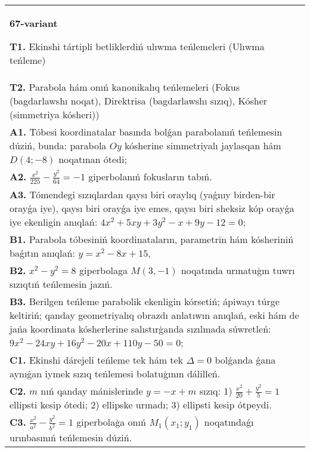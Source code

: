 \documentclass{article}
\begin{document}
\begin{tabular}{m{17cm}}
\textbf{67-variant}
\newline

\textbf{T1.} Ekinshi tártipli betliklerdiń ulıwma teńlemeleri (Ulıwma teńleme) \\
\textbf{T2.} Parabola hám onıń kanonikalıq teńlemeleri (Fokus (bagdarlawshı noqat), Direktrisa (bagdarlawshı sızıq), Kósher (simmetriya kósheri)) \\
\textbf{A1.} Tóbesi koordinatalar basında bolǵan parabolanıń teńlemesin dúziń, bunda: parabola $Oy$ kósherine simmetriyalı jaylasqan hám $D (4; -8) $ noqatınan ótedi; \\
\textbf{A2.} $\frac{x^2}{225}-\frac{y^2}{64}=-1$ giperbolanıń fokusların tabıń. \\
\textbf{A3.} Tómendegi sızıqlardan qaysı biri oraylıq (yaǵnıy birden-bir orayǵa iye), qaysı biri orayǵa iye emes, qaysı biri sheksiz kóp orayǵa iye ekenligin anıqlań: $4 x^2+5 x y+3 y^2-x+9 y-12=0$; \\
\textbf{B1.} Parabola tóbesiniń koordinataların, parametrin hám kósheriniń baǵıtın anıqlań: $y=x^2-8 x+15$, \\
\textbf{B2.} $x^2-y^2=8$ giperbolaga $M(3,-1)$ noqatında urınatuģın tuwrı sızıqtıń teńlemesin jazıń. \\
\textbf{B3.} Berilgen teńleme parabolik ekenligin kórsetiń; ápiwayı túrge keltiriń; qanday geometriyalıq obrazdı anlatıwın anıqlań, eski hám de jańa koordinata kósherlerine salıstırģanda sızılmada súwretleń:$9 x^2-24 x y+16 y^2-20 x+110 y-50=0$; \\
\textbf{C1.} Ekinshi dárejeli teńleme tek hám tek $\Delta=0$ bolǵanda ǵana aynıǵan iymek sızıq teńlemesi bolatuģının dálilleń. \\
\textbf{C2.} $m$ nıń qanday mánislerinde $y=-x+m$ sızıq: 1) $\frac{x^2}{20}+\frac{y^2}{5}=1$ ellipsti kesip ótedi; 2) ellipske urınadı; 3) ellipsti kesip ótpeydi. \\
\textbf{C3.} $\frac{x^2}{a^2}-\frac{y^2}{b^2}=1$ giperbolaģa onıń $M_1\left(x_1; y_1\right) $ noqatındaǵı urınbasınıń teńlemesin dúziń. \\

\end{tabular}
\vspace{1cm}
\end{document}
